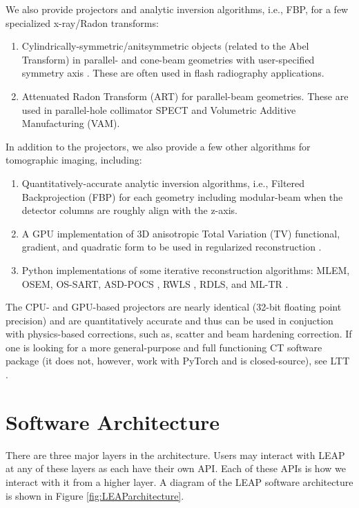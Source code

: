 \documentclass[11pt]{article}
\begin{document}
We also provide projectors and analytic inversion algorithms, i.e., FBP, for a few specialized x-ray/Radon transforms:
\begin{enumerate}
\item Cylindrically-symmetric/anitsymmetric objects (related to the Abel Transform) in parallel- and cone-beam geometries with user-specified symmetry axis \cite{ChampleyMaddox_Optica_2021}. These are often used in flash radiography applications.
\item Attenuated Radon Transform (ART) for parallel-beam geometries. These are used in parallel-hole collimator SPECT and Volumetric Additive Manufacturing (VAM).
\end{enumerate}

In addition to the projectors, we also provide a few other algorithms for tomographic imaging, including:
\begin{enumerate}
\item Quantitatively-accurate analytic inversion algorithms, i.e., Filtered Backprojection (FBP) for each geometry including modular-beam when the detector columns are roughly align with the z-axis.
\item A GPU implementation of 3D anisotropic Total Variation (TV) functional, gradient, and quadratic form to be used in regularized reconstruction \cite{Yu_MIC_2006}.
\item Python implementations of some iterative reconstruction algorithms: MLEM, OSEM, OS-SART, ASD-POCS \cite{ASDPOCS_PMB_2008}, RWLS \cite{Hager_Zhang_CG_2005, Fessler_TIP_1999, Yu_MIC_2006}, RDLS, and ML-TR \cite{IMPACT_TMI_2001}.
\end{enumerate}

The CPU- and GPU-based projectors are nearly identical (32-bit floating point precision) and are quantitatively accurate and thus can be used in conjuction with physics-based corrections, such as, scatter and beam hardening correction. If one is looking for a more general-purpose and full functioning CT software package (it does not, however, work with PyTorch and is closed-source), see LTT \cite{ChampleyLTT}.

\section{Software Architecture}

There are three major layers in the architecture.  Users may interact with LEAP at any of these layers as each have their own API.  Each of these APIs is how we interact with it from a higher layer.  A diagram of the LEAP software architecture is shown in Figure \ref{fig:LEAParchitecture}.
\end{document}
